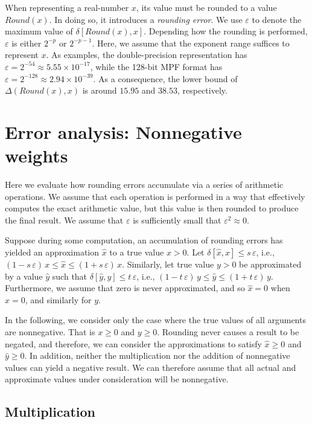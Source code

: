 \documentclass[letterpaper,USenglish,cleveref, autoref, thm-restate]{lipics-v2021}
\newcommand{\approximate}[1]{\hat{#1}}
\newcommand{\approxx}{\approximate{x}}
\newcommand{\approxy}{\approximate{y}}
\newcommand{\round}{\mathit{Round}}
\newcommand{\aerror}{\delta}
\newcommand{\digitprecision}{\Delta}
\newcommand{\roundepsilon}{\varepsilon}
\begin{document}
When representing a real-number $x$, its value must be rounded to a
value $\round(x)$.  In doing so, it introduces a \emph{rounding
error}.  We use $\roundepsilon$ to denote the maximum value of
$\aerror[\round(x), x]$.  Depending how the rounding
is performed, $\roundepsilon$ is either $2^{-p}$ or $2^{-p-1}$.  Here, we assume that the exponent range suffices to represent $x$.
As examples, the double-precision representation has $\roundepsilon = 2^{-54} \approx 5.55 \times 10^{-17}$, while the 128-bit MPF format
has $\roundepsilon = 2^{-128} \approx 2.94 \times 10^{-39}$.  As a consequence, the lower bound of $\digitprecision(\round(x), x)$ is around $15.95$ and $38.53$, respectively.

\section{Error analysis: Nonnegative weights}

Here we evaluate how rounding errors accumulate via a series of arithmetic operations.  We assume that each operation is performed in a way that effectively computes the exact
arithmetic value, but this value is then rounded to produce the final result.  We assume that $\roundepsilon$ is sufficiently small that $\roundepsilon^2 \approx 0$.

Suppose during some computation, an accumulation of rounding errors has yielded an approximation $\approxx$ to a true value $x > 0$.
Let $\aerror[\approxx, x] \leq s\, \roundepsilon$, i.e., $(1-s\,\roundepsilon)\, x \leq \approxx \leq (1+s\,\roundepsilon)\, x$.  Similarly, let true value $y > 0$ be
approximated by a value $\approxy$ such that 
$\aerror[\approxy, y] \leq t\, \roundepsilon$, i.e., $(1-t\,\roundepsilon)\, y \leq \approxy \leq (1+t\,\roundepsilon)\, y$.
Furthermore, we assume that zero is never approximated, and so $\approxx = 0$ when $x = 0$, and similarly for $y$.

In the following, we consider only the case where the true values of
all arguments are nonnegative.  That is $x \geq 0$ and $y \geq 0$.
Rounding never causes a result to be negated, and therefore, we can
consider the approximations to satisfy $\approxx \geq 0$ and $\approxy
\geq 0$.  In addition, neither the multiplication nor the addition of
nonnegative values can yield a negative result.  We can therefore
assume that all actual and approximate values under consideration will
be nonnegative.

\subsection{Multiplication}
\end{document}
